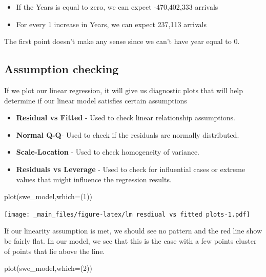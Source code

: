 \documentclass[
]{book}
\newenvironment{Shaded}{\begin{snugshade}}{\end{snugshade}}
\newcommand{\AttributeTok}[1]{\textcolor[rgb]{0.77,0.63,0.00}{#1}}
\newcommand{\DecValTok}[1]{\textcolor[rgb]{0.00,0.00,0.81}{#1}}
\newcommand{\FunctionTok}[1]{\textcolor[rgb]{0.00,0.00,0.00}{#1}}
\newcommand{\NormalTok}[1]{#1}
\begin{document}
\begin{itemize}
\item
  If the Years is equal to zero, we can expect -470,402,333 arrivals
\item
  For every 1 increase in Years, we can expect 237,113 arrivals
\end{itemize}

The first point doesn't make any sense since we can't have year equal to 0.

\hypertarget{assumption-checking}{%
\subsection{Assumption checking}\label{assumption-checking}}

If we plot our linear regression, it will give us diagnostic plots that will help determine if our linear model satisfies certain assumptions

\begin{itemize}
\item
  \textbf{Residual vs Fitted} - Used to check linear relationship assumptions.
\item
  \textbf{Normal Q-Q}- Used to check if the residuals are normally distributed.
\item
  \textbf{Scale-Location} - Used to check homogeneity of variance.
\item
  \textbf{Residuals vs Leverage} - Used to check for influential cases or extreme values that might influence the regression results.
\end{itemize}

\begin{Shaded}
\begin{Highlighting}[]
\FunctionTok{plot}\NormalTok{(swe\_model,}\AttributeTok{which=}\NormalTok{(}\DecValTok{1}\NormalTok{))}
\end{Highlighting}
\end{Shaded}

\texttt{[image: \_main\_files/figure-latex/lm resdiual vs fitted plots-1.pdf]}

If our linearity assumption is met, we should see no pattern and the red line show be fairly flat. In our model, we see that this is the case with a few points cluster of points that lie above the line.

\begin{Shaded}
\begin{Highlighting}[]
\FunctionTok{plot}\NormalTok{(swe\_model,}\AttributeTok{which=}\NormalTok{(}\DecValTok{2}\NormalTok{))}
\end{Highlighting}
\end{Shaded}
\end{document}
